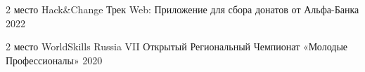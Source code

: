 



\begin{cvhonors}

  \cvhonor
    {2 место} %
    {Hack\&Change Трек Web: Приложение для сбора донатов от Альфа-Банка} %
    {} %
    {2022} %

  \cvhonor
    {2 место} %
    {WorldSkills Russia VII Открытый Региональный Чемпионат «Молодые Профессионалы»} %
    {} %
    {2020} %

\end{cvhonors}
